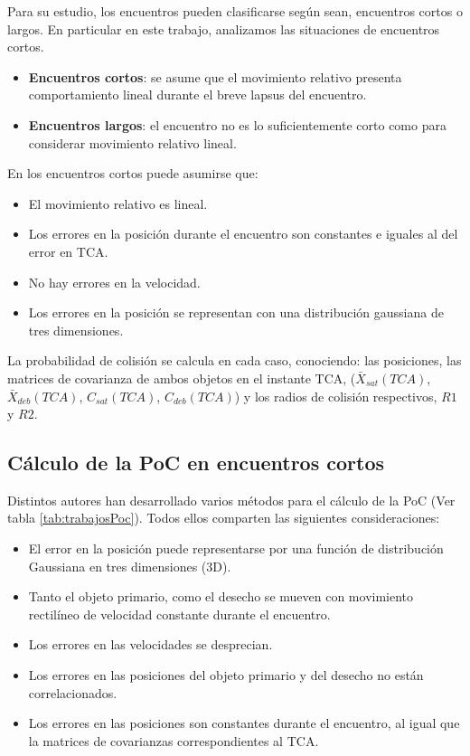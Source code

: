 {Para su estudio, los encuentros pueden clasificarse seg\'un sean, encuentros cortos o largos. En particular en este trabajo, analizamos las situaciones de encuentros cortos.\\

\begin{itemize}
 \item {\bf{Encuentros cortos}}: se asume que el movimiento relativo presenta comportamiento lineal durante el breve lapsus del encuentro.
 \item {\bf{Encuentros largos}}: el encuentro no es lo suficientemente corto como para considerar movimiento relativo lineal.
\end{itemize}


En los encuentros cortos puede asumirse que:\\

\begin{itemize}
\itemsep0em
 \item El movimiento relativo es lineal.
 \item Los errores en la posici\'on durante el encuentro son constantes e iguales al del error en TCA.
 \item No hay errores en la velocidad.
 \item Los errores en la posici\'on se representan con una distribuci\'on gaussiana de tres dimensiones.
\end{itemize}

La probabilidad de colisi\'on se calcula en cada caso, conociendo: las posiciones, las matrices de covarianza de ambos objetos en el instante TCA, ($\bar{X}_{sat}(TCA)$, $\bar{X}_{deb}(TCA)$, $C_{sat}(TCA)$, $C_{deb}(TCA)$) y los radios de colisi\'on respectivos, $R1$ y $R2$.

\subsection*{C\'alculo de la PoC en encuentros cortos}

Distintos autores han desarrollado varios m\'etodos para el c\'alculo de la PoC (Ver tabla \ref{tab:trabajosPoc}). Todos ellos comparten las siguientes consideraciones:\\
\begin{itemize}
\itemsep0em
\item El error en la posici\'on puede representarse por una funci\'on de distribuci\'on Gaussiana en tres dimensiones (3D).
\item Tanto el objeto primario, como el desecho se mueven con movimiento rectil\'ineo de velocidad constante durante el encuentro.
\item Los errores en las velocidades se desprecian.
\item Los errores en las posiciones del objeto primario y del desecho no est\'an correlacionados.
\item Los errores en las posiciones son constantes durante el encuentro, al igual que la matrices de covarianzas correspondientes al TCA.
\end{itemize}

}
